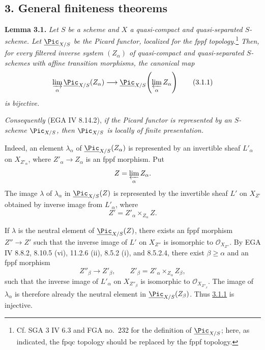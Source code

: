 \subsection*{3. General finiteness theorems}

\textbf{Lemma 3.1.} \emph{Let \(S\) be a scheme and \(X\) a
quasi-compact and quasi-separated \(S\)-scheme. Let
\(\underline{\Pic}_{X/S}\) be the Picard functor, localized for the fppf
topology.}\footnote{Cf. SGA 3 IV 6.3 and FGA no.~232 for the definition of
\(\underline{\Pic}_{X/S}\); here, as indicated, the fpqc topology should be
replaced by the fppf topology.}
\emph{Then, for every filtered inverse system \((Z_\alpha)\) of
quasi-compact and quasi-separated \(S\)-schemes with affine transition
morphisms, the canonical map}
\begin{equation}
\varinjlim_\alpha\underline{\Pic}_{X/S}(Z_\alpha)
\longrightarrow
\underline{\Pic}_{X/S}\!\left(\varprojlim_\alpha Z_\alpha\right)
\tag{3.1.1}
\end{equation}
\emph{is bijective.}

\emph{Consequently} (EGA IV 8.14.2), \emph{if the Picard functor is
represented by an \(S\)-scheme \(\Pic_{X/S}\), then \(\Pic_{X/S}\) is
locally of finite presentation.}

Indeed, an element \(\lambda_\alpha\) of
\(\underline{\Pic}_{X/S}(Z_\alpha)\) is represented by an invertible sheaf
\(L'_\alpha\) on \(X_{Z'_\alpha}\), where
\(Z'_\alpha\to Z_\alpha\) is an fppf morphism. Put
\[
Z=\varprojlim_\alpha Z_\alpha.
\]
The image \(\lambda\) of \(\lambda_\alpha\) in
\(\underline{\Pic}_{X/S}(Z)\) is represented by the invertible sheaf
\(L'\) on \(X_{Z'}\) obtained by inverse image from \(L'_\alpha\), where
\[
Z'=Z'_\alpha\times_{Z_\alpha}Z.
\]

If \(\lambda\) is the neutral element of
\(\underline{\Pic}_{X/S}(Z)\), there exists an fppf morphism
\(Z''\to Z'\) such that the inverse image of \(L'\) on \(X_{Z''}\) is
isomorphic to \(\mathcal O_{X_{Z''}}\). By EGA IV 8.8.2, 8.10.5 (vi),
11.2.6 (ii), 8.5.2 (i), and 8.5.2.4, there exist
\(\beta\ge\alpha\) and an fppf morphism
\[
Z''_\beta\longrightarrow Z'_\beta,
\qquad
Z'_\beta=Z'_\alpha\times_{Z_\alpha}Z_\beta,
\]
such that the inverse image of \(L'_\alpha\) on \(X_{Z''_\beta}\) is
isomorphic to \(\mathcal O_{X_{Z''_\beta}}\). The image of
\(\lambda_\alpha\) is therefore already the neutral element in
\(\underline{\Pic}_{X/S}(Z_\beta)\). Thus \hyperlink{sga6.e13.eq.3-1-1}{3.1.1} is injective.

